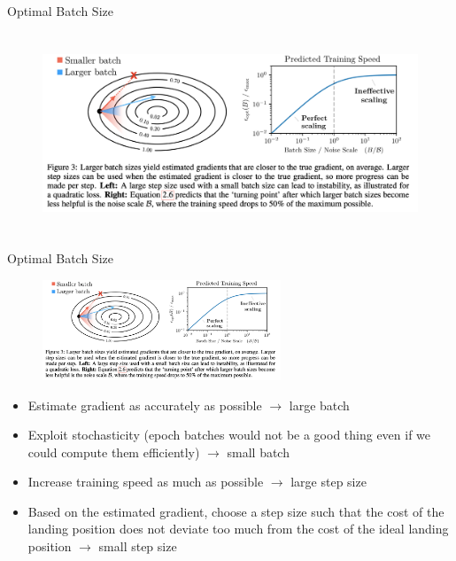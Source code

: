 
\begin{vbframe}{Optimal Batch Size}

\begin{figure}
    \centering
    \includegraphics[height = 6cm]{figure/optimalbatchsize.png}
\end{figure}


\end{vbframe}

\begin{vbframe}{Optimal Batch Size}

\begin{figure}
    \centering
    \includegraphics[height = 3cm]{figure/optimalbatchsize.png}
\end{figure}

\begin{itemize}
    \item Estimate gradient as accurately as possible $\rightarrow$ large batch
    \item Exploit stochasticity (epoch batches would not be
    a good thing even if we could compute them efficiently)
    $\rightarrow$ small batch    \item Increase training speed as much as possible $\rightarrow$ large step size
    \item Based on the estimated gradient, choose a step size such that the cost of the landing position does not deviate too much from the cost of the ideal landing position $\rightarrow$ small step size


\end{itemize}

\end{vbframe}

